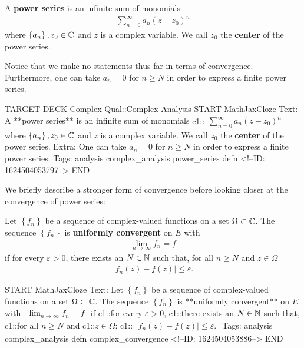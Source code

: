 \documentclass{memoir}
\begin{document}
\begin{defn}
A \textbf{power series} is an infinite sum of monomials
\begin{align*}
	\sum_{n=0}^{\infty} a_n (z-z_0)^{n}
\end{align*}
where \(\left\{ a_n \right\},z_0  \in \mathbb{C}\) and \(z\) is a complex variable. We call \(z_0\) the \textbf{center} of the power series.
\end{defn}
Notice that we make no statements thus far in terms of convergence. Furthermore, one can take \(a_n = 0\) for \(n\geq N\) in order to express a finite power series.\\

\begin{anki}
TARGET DECK
Complex Qual::Complex Analysis
START
MathJaxCloze
Text: A **power series** is an infinite sum of monomials
{{c1::\(\begin{align*}
        	\sum_{n=0}^{\infty} a_n (z-z_0)^{n}
        \end{align*}\)}}
where \(\left\{ a_n \right\},z_0  \in \mathbb{C}\) and \(z\) is a complex variable. We call \(z_0\) the \textbf{center} of the power series.
Extra: One can take \(a_n = 0\) for \(n\geq N\) in order to express a finite power series.
Tags: analysis complex_analysis power_series defn
<!--ID: 1624504053797-->
END
\end{anki}


We briefly describe a stronger form of convergence before looking closer at the convergence of power series:
\begin{defn}
	Let \(\left\{ f_n \right\} \) be a sequence of complex-valued functions on a set \(\Omega\subset \mathbb{C}\). The sequence \(\left\{ f_n \right\} \) is \textbf{uniformly convergent} on \(E\) with
	\begin{align*}
		\lim_{n \to \infty} f_n = f
	\end{align*}
	if for every \(\varepsilon>0\), there exists an \(N \in \mathbb{N}\) such that, for all \(n\geq N\) and \(z \in \Omega\)
	\begin{align*}
		\left| f_n(z) - f(z) \right| \leq \varepsilon.
	\end{align*}
\end{defn}

\begin{anki}
START
MathJaxCloze
Text: Let \(\left\{ f_n \right\} \) be a sequence of complex-valued functions on a set \(\Omega\subset \mathbb{C}\). The sequence \(\left\{ f_n \right\} \) is **uniformly convergent** on \(E\) with
\(\begin{align*}
  	\lim_{n \to \infty} f_n = f
  \end{align*}\)
	if {{c1::for every \(\varepsilon>0\)}}, {{c1::there exists an \(N \in \mathbb{N}\)}} such that, {{c1::for all \(n\geq N\)}} and {{c1::\(z \in \Omega\)}}:
	{{c1::\(\begin{align*}
	        	\left| f_n(z) - f(z) \right| \leq \varepsilon.
	        \end{align*}\)}} 
Tags: analysis complex_analysis defn complex_convergence
<!--ID: 1624504053886-->
END
\end{anki}
\end{document}
